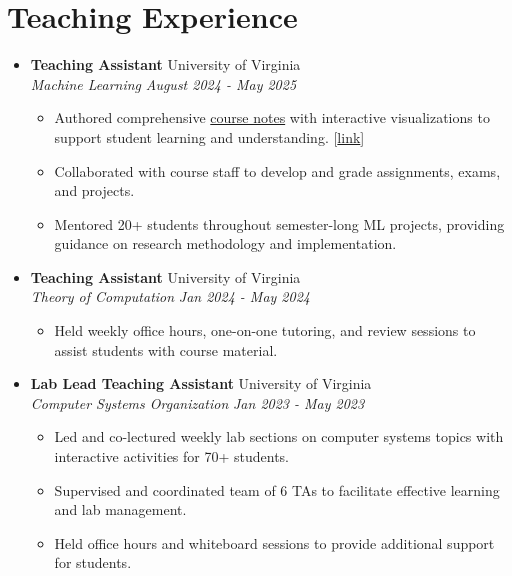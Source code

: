 \documentclass[letterpaper,11pt]{article}
\newcommand{\linkhref}[2]{\textcolor{linkblue}{\href{#1}{#2}}}
\newcommand{\Date}[1]{\textit{\small #1}}
\newcommand{\heading}[4]{
  \textbf{#1} \hfill #2 \\
  \textit{\small#3} \hfill \Date{#4}
}
\begin{document}
\section{Teaching Experience}
\begin{itemize}[label={}, leftmargin=0pt]
  \item \heading{Teaching Assistant}{University of Virginia}
        {Machine Learning}{August 2024 - May 2025}
        \begin{itemize}
          \item Authored comprehensive \href{https://www.brandonyifanyang.com/notes/ml}{course notes} with interactive visualizations to support student learning and understanding. [\linkhref{https://www.brandonyifanyang.com/notes/ml}{link}]
          \item Collaborated with course staff to develop and grade assignments, exams, and projects.
          \item Mentored 20+ students throughout semester-long ML projects, providing guidance on research methodology and implementation.
        \end{itemize}
  \item \heading{Teaching Assistant}{University of Virginia}
        {Theory of Computation}{Jan 2024 - May 2024}
        \begin{itemize}
          \item Held weekly office hours, one-on-one tutoring, and review sessions to assist students with course material.
        \end{itemize}
  \item \heading{Lab Lead Teaching Assistant}{University of Virginia}
        {Computer Systems Organization}{Jan 2023 - May 2023}
        \begin{itemize}
          \item Led and co-lectured weekly lab sections on computer systems topics with interactive activities for 70+ students.
          \item Supervised and coordinated team of 6 TAs to facilitate effective learning and lab management.
          \item Held office hours and whiteboard sessions to provide additional support for students.
        \end{itemize}
\end{itemize}
\end{document}
